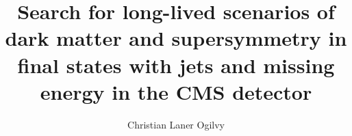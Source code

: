 \documentclass[hyperpdf,oneside]{hepthesis}
\title{Search for long-lived scenarios of dark matter and supersymmetry in 
final states with jets and missing energy in the CMS detector}
\author{Christian Laner Ogilvy}
\begin{document}
\begin{frontmatter}
  
\end{frontmatter}

\begin{mainmatter}
  
  
  
  
  
  
\end{mainmatter}

\begin{appendices}
  
\end{appendices}

\begin{backmatter}
  
\end{backmatter}

\end{document}
